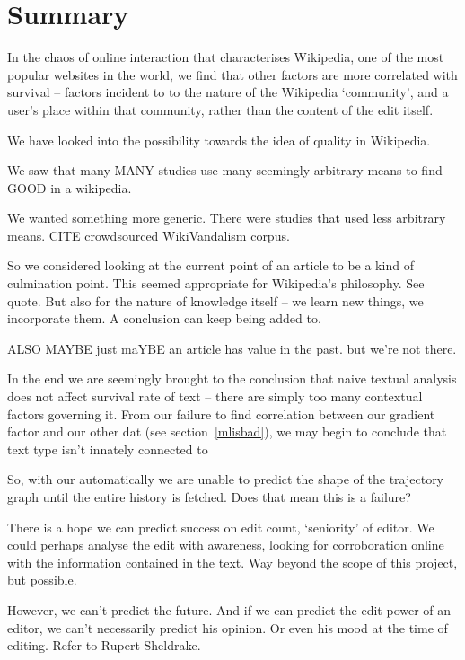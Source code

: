 \section{Summary}

In the chaos of online interaction that characterises Wikipedia, one
of the most popular websites in the world, we find that other factors
are more correlated with survival -- factors incident to to the nature
of the Wikipedia `community', and a user's place within that
community, rather than the content of the edit itself.

We have looked into the possibility towards the idea of quality in
Wikipedia. 

We saw that many MANY studies use many seemingly arbitrary means to
find GOOD in a wikipedia.

We wanted something more generic. There were studies that used less
arbitrary means. CITE crowdsourced WikiVandalism corpus. 

So we considered looking at the current point of an article to be a
kind of culmination point. This seemed appropriate for Wikipedia's
philosophy. See quote. But also for the nature of knowledge itself --
we learn new things, we incorporate them. A conclusion can keep being
added to.

ALSO MAYBE just maYBE an article has value in the past. but we're not
there.

In the end we are seemingly brought to the conclusion that naive
textual analysis does not affect survival rate of text -- there are
simply too many contextual factors governing it. From our failure to
find correlation between our gradient factor and our other dat (see
section~\ref{mlisbad}), we may begin to conclude that text type isn't
innately connected to 

So, with our automatically we are unable to predict the shape of the
trajectory graph until the entire history is fetched. Does that mean
this is a failure? 

There is a hope we can predict success on edit count, `seniority' of
editor. We could perhaps analyse the edit with awareness, looking for
corroboration online with the information contained in the
text. Way beyond the scope of this project, but possible.

However, we can't predict the future. And if we can predict the
edit-power of an editor, we can't necessarily predict his opinion. Or
even his mood at the time of editing. Refer to Rupert Sheldrake.
